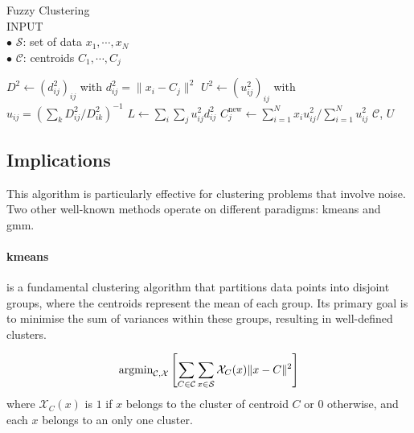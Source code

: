 \begin{algorithm}[h]
\caption{Fuzzy Clustering\\
	\textsc{INPUT}\\
	$\bullet$ $\mathcal{S}$: set of data $x_1,\cdots,x_N$\\
	$\bullet$ $\mathcal{C}$: centroids $C_1,\cdots,C_j$}
\begin{algorithmic}[1]
        \State $D^2 \gets (d^2_{ij})_{ij}$ with $d_{ij}^2=\|x_i-C_j\|^2$
        \State $U^2 \gets (u_{ij}^2)_{ij}$ with $u_{ij}=\left(\sum_{k}D^2_{ij}/D^2_{ik}\right)^{-1}$
        \State $L \gets \sum_i\sum_j u_{ij}^2d_{ij}^2$
            \State $C^\text{new}_j \gets \sum_{i=1}^N x_iu^2_{ij} / \sum_{i=1}^N u^2_{ij}$
        \EndFor
    \EndWhile
    \State \Return $\mathcal{C}$, $U$
\EndFunction
\end{algorithmic}
\label{alg:FuzzyClustering}
\end{algorithm}

\subsection{Implications}
This algorithm is particularly effective for clustering problems that involve noise. Two other well-known methods operate on different paradigms: \gls{kmeans} and \gls{gmm}.

\paragraph{\gls{kmeans}} is a fundamental clustering algorithm that partitions data points into disjoint groups, where the centroids represent the mean of each group. Its primary goal is to minimise the sum of variances within these groups, resulting in well-defined clusters.
\begin{toReview}
\begin{equation*}
	\textnormal{argmin}_{\mathcal{C}, \mathcal{X}}\left[\sum_{C\in\mathcal{C}}\sum_{x \in \mathcal{S}}\mathcal{X}_C(x)\|x-C\|^2\right]
\end{equation*}
where $\mathcal{X}_C(x)$ is $1$ if $x$ belongs to the cluster of centroid $C$ or $0$ otherwise, and each $x$ belongs to an only one cluster.
\end{toReview}

